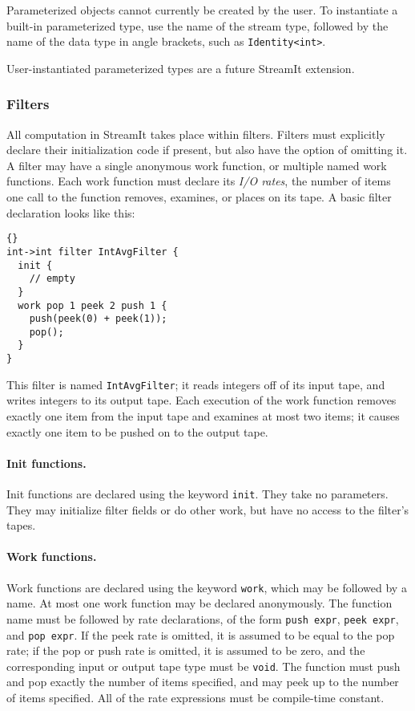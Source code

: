 \documentclass[11pt]{article}
\begin{document}
Parameterized objects cannot currently be created by the user.  To
instantiate a built-in parameterized type, use the name of the stream
type, followed by the name of the data type in angle brackets, such as
\lstinline|Identity<int>|.

\begin{note}
User-instantiated parameterized types are a future StreamIt
extension.
\end{note}

\subsubsection{Filters}

All computation in StreamIt takes place within filters.  Filters must
explicitly declare their initialization code if present, but also have
the option of omitting it.  A filter may have a single anonymous work
function, or multiple named work functions.  Each work function must
declare its \emph{I/O rates}, the number of items one call to the
function removes, examines, or places on its tape.  A basic filter
declaration looks like this:

\begin{lstlisting}{}
int->int filter IntAvgFilter {
  init {
    // empty
  }
  work pop 1 peek 2 push 1 {
    push(peek(0) + peek(1));
    pop();
  }
}
\end{lstlisting}

This filter is named \lstinline|IntAvgFilter|; it reads integers off of its
input tape, and writes integers to its output tape.  Each execution of
the work function removes exactly one item from the input tape and
examines at most two items; it causes exactly one item to be pushed on
to the output tape.

\paragraph{Init functions.}  Init functions are declared using the
keyword \lstinline|init|.  They take no parameters.  They may initialize
filter fields or do other work, but have no access to the filter's
tapes.

\paragraph{Work functions.}  Work functions are declared using the
keyword \lstinline|work|, which may be followed by a name.  At most one
work function may be declared anonymously.  The function name must be
followed by rate declarations, of the form \lstinline|push expr|,
\lstinline|peek expr|, and \lstinline|pop expr|.  If the peek
rate is omitted, it is assumed to be equal to the pop rate; if the pop
or push rate is omitted, it is assumed to be zero, and the
corresponding input or output tape type must be \lstinline|void|.  The
function must push and pop exactly the number of items specified, and
may peek up to the number of items specified.  All of the rate
expressions must be compile-time constant.
\end{document}
